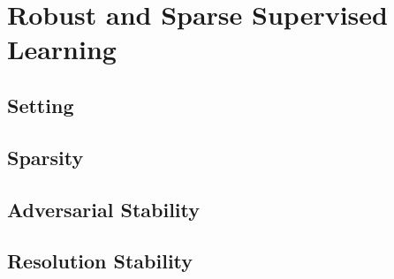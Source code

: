 \chapter{Robust and Sparse Supervised Learning}\label{ch:SL}

\cite{bungert2021clip, bungert2021neural, kabri2023resolution, bungert2022bregman}
%
\section{Setting}
%
\section{Sparsity}
%
\section{Adversarial Stability}
%
\section{Resolution Stability}
%

